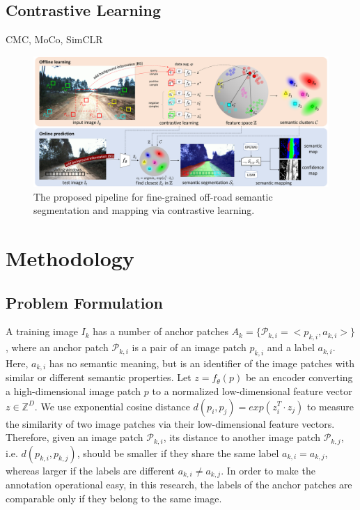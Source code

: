 \documentclass[letterpaper, 10 pt, conference]{ieeeconf}  %
\begin{document}
\subsection{Contrastive Learning}
CMC, MoCo, SimCLR

\begin{figure}[]
	\centering
	\includegraphics[width=\textwidth]{pipeline.pdf}
	\caption{The proposed pipeline for fine-grained off-road semantic segmentation and mapping via contrastive learning.}
	\label{fig:pipeline}
\end{figure}


\section{Methodology} \label{methodology}

\subsection{Problem Formulation}

A training image $I_k$ has a number of anchor patches $A_k=\{\mathcal{P}_{k,i}=<p_{k,i},a_{k,i}>\}$, where an anchor patch $\mathcal{P}_{k,i}$ is a pair of an image patch $p_{k,i}$ and a label $a_{k,i}$. Here, $a_{k,i}$ has no semantic meaning, but is an identifier of the image patches with similar or different semantic properties.
Let $z=f_{\theta}(p)$ be an encoder converting a high-dimensional image patch $p$ to a normalized low-dimensional feature vector $z\in \mathbb{Z}^D$. 
We use exponential cosine distance $d(p_i,p_j)=exp(z_i^T \cdot z_j)$ to measure the similarity of two image patches via their low-dimensional feature vectors.
Therefore, given an image patch $\mathcal{P}_{k,i}$, its distance to another image patch $\mathcal{P}_{k,j}$, i.e. $d(p_{k,i},p_{k,j})$, should be smaller if they share the same label $a_{k,i}=a_{k,j}$, whereas larger if the labels are different $a_{k,i} \neq a_{k,j}$.
In order to make the annotation operational easy, in this research, the labels of the anchor patches are comparable only if they belong to the same image.
\end{document}
